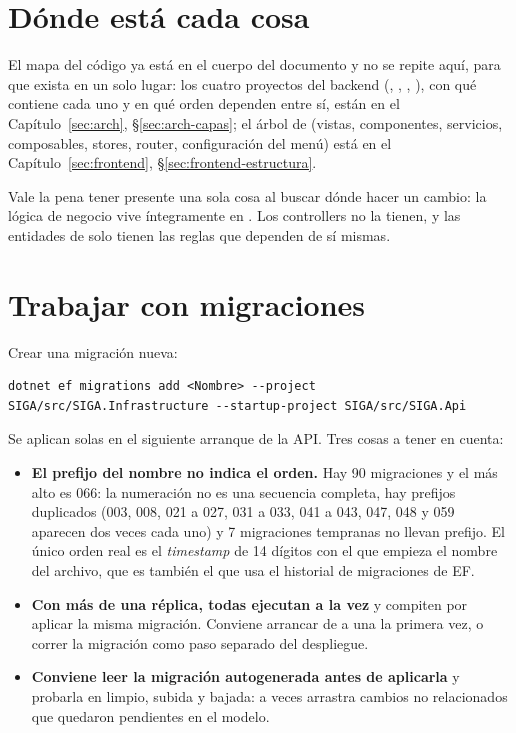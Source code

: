 \section{Dónde está cada cosa}
\label{sec:mt-estructura}

El mapa del código ya está en el cuerpo del documento y no se repite aquí, para que exista en un solo lugar: los cuatro proyectos del backend (\allowbreak {}, \allowbreak {}, \allowbreak {}, ), con qué contiene cada uno y en qué orden dependen entre sí, están en el Capítulo~\ref{sec:arch}, \S\ref{sec:arch-capas}; el árbol de  (vistas, componentes, servicios, composables, stores, router, configuración del menú) está en el Capítulo~\ref{sec:frontend}, \S\ref{sec:frontend-estructura}.

Vale la pena tener presente una sola cosa al buscar dónde hacer un cambio: la lógica de negocio vive íntegramente en \allowbreak {}\allowbreak {}. Los controllers no la tienen, y las entidades de  solo tienen las reglas que dependen de sí mismas.

\section{Trabajar con migraciones}
\label{sec:mt-migraciones}

Crear una migración nueva:

\begin{lstlisting}[numbers=none]
dotnet ef migrations add <Nombre> --project SIGA/src/SIGA.Infrastructure --startup-project SIGA/src/SIGA.Api
\end{lstlisting}

Se aplican solas en el siguiente arranque de la API. Tres cosas a tener en cuenta:

\begin{itemize}
  \item \textbf{El prefijo  del nombre no indica el orden.} Hay 90 migraciones y el  más alto es 066: la numeración no es una secuencia completa, hay prefijos duplicados (003, 008, 021 a 027, 031 a 033, 041 a 043, 047, 048 y 059 aparecen dos veces cada uno) y 7 migraciones tempranas no llevan prefijo. El único orden real es el \emph{timestamp} de 14 dígitos con el que empieza el nombre del archivo, que es también el que usa el historial de migraciones de EF.
  \item \textbf{Con más de una réplica, todas ejecutan  a la vez} y compiten por aplicar la misma migración. Conviene arrancar de a una la primera vez, o correr la migración como paso separado del despliegue.
  \item \textbf{Conviene leer la migración autogenerada antes de aplicarla} y probarla en limpio, subida y bajada: a veces arrastra cambios no relacionados que quedaron pendientes en el modelo.
\end{itemize}

